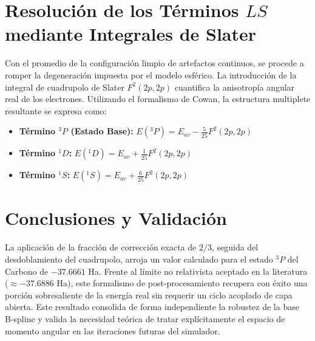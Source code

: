 \documentclass[11pt, a4paper]{article}
\begin{document}
\section{Resolución de los Términos $LS$ mediante Integrales de Slater}
Con el promedio de la configuración limpio de artefactos continuos, se procede a romper la degeneración impuesta por el modelo esférico. La introducción de la integral de cuadrupolo de Slater $F^2(2p, 2p)$ cuantifica la anisotropía angular real de los electrones. Utilizando el formalismo de Cowan, la estructura multiplete resultante se expresa como:

\begin{itemize}
    \item \textbf{Término $^3P$ (Estado Base):} $E(^3P) = E_{av} - \frac{5}{25} F^2(2p, 2p)$
    \item \textbf{Término $^1D$:} $E(^1D) = E_{av} + \frac{1}{25} F^2(2p, 2p)$
    \item \textbf{Término $^1S$:} $E(^1S) = E_{av} + \frac{6}{25} F^2(2p, 2p)$
\end{itemize}

\section{Conclusiones y Validación}
La aplicación de la fracción de corrección exacta de $2/3$, seguida del desdoblamiento del cuadrupolo, arroja un valor calculado para el estado $^3P$ del Carbono de $-37.6661$ Ha. Frente al límite no relativista aceptado en la literatura ($\approx -37.6886$ Ha), este formalismo de post-procesamiento recupera con éxito una porción sobresaliente de la energía real sin requerir un ciclo acoplado de capa abierta. Este resultado consolida de forma independiente la robustez de la base B-spline y valida la necesidad teórica de tratar explícitamente el espacio de momento angular en las iteraciones futuras del simulador.
\end{document}
